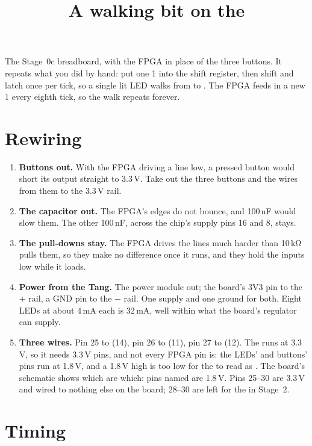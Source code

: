 \documentclass[11pt,a4paper]{article}
\title{A walking bit on the \name{74HC595}}
\author{}
\date{}
\begin{document}
\maketitle

The Stage~0c breadboard, with the FPGA in place of the three buttons. It repeats what you did by hand: put one 1 into the shift register, then shift and latch once per tick, so a single lit LED walks from  to . The FPGA feeds in a new 1 every eighth tick, so the walk repeats forever.

\section*{Rewiring}

\begin{enumerate}
  \item \textbf{Buttons out.} With the FPGA driving a line low, a pressed button would short its output straight to 3.3\,V. Take out the three buttons and the wires from them to the 3.3\,V rail.
  \item \textbf{The  capacitor out.} The FPGA’s edges do not bounce, and 100\,nF would slow them. The other 100\,nF, across the chip’s supply pins 16 and 8, stays.
  \item \textbf{The pull-downs stay.} The FPGA drives the lines much harder than 10\,kΩ pulls them, so they make no difference once it runs, and they hold the inputs low while it loads.
  \item \textbf{Power from the Tang.} The power module out; the board’s 3V3 pin to the $+$ rail, a GND pin to the $-$ rail. One supply and one ground for both. Eight LEDs at about 4\,mA each is 32\,mA, well within what the board’s regulator can supply.
  \item \textbf{Three wires.} Pin 25 to  (14), pin 26 to  (11), pin 27 to  (12). The  runs at 3.3\,V, so it needs 3.3\,V pins, and not every FPGA pin is: the LEDs’ and buttons’ pins run at 1.8\,V, and a 1.8\,V high is too low for the  to read as . The board’s schematic shows which are which: pins named  are 1.8\,V. Pins 25--30 are 3.3\,V and wired to nothing else on the board; 28--30 are left for the  in Stage~2.
\end{enumerate}

\section*{Timing}
\end{document}
